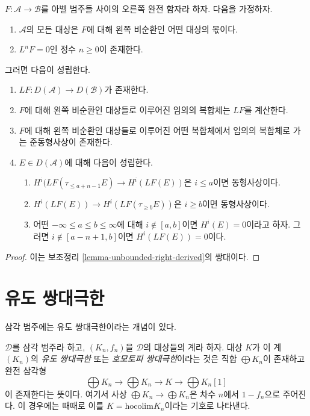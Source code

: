 \begin{lemma}
\label{lemma-unbounded-left-derived}
$F : \mathcal{A} \to \mathcal{B}$를 아벨 범주들 사이의 오른쪽 완전
함자라 하자. 다음을 가정하자.
\begin{enumerate}
\item $\mathcal{A}$의 모든 대상은 $F$에 대해 왼쪽 비순환인 어떤
대상의 몫이다.
\item $L^nF = 0$인 정수 $n \geq 0$이 존재한다.
\end{enumerate}
그러면 다음이 성립한다.
\begin{enumerate}
\item $LF : D(\mathcal{A}) \to D(\mathcal{B})$가 존재한다.
\item $F$에 대해 왼쪽 비순환인 대상들로 이루어진 임의의 복합체는
$LF$를 계산한다.
\item $F$에 대해 왼쪽 비순환인 대상들로 이루어진 어떤 복합체에서
임의의 복합체로 가는 준동형사상이 존재한다.
\item $E \in D(\mathcal{A})$에 대해 다음이 성립한다.
\begin{enumerate}
\item $H^i(LF(\tau_{\leq a + n - 1}E) \to H^i(LF(E))$은
$i \leq a$이면 동형사상이다.
\item $H^i(LF(E)) \to H^i(LF(\tau_{\geq b}E))$은 $i \geq b$이면
동형사상이다.
\item 어떤 $-\infty \leq a \leq b \leq \infty$에 대해
$i \not \in [a, b]$이면 $H^i(E) = 0$이라고 하자. 그러면
$i \not \in [a - n + 1, b]$이면 $H^i(LF(E)) = 0$이다.
\end{enumerate}
\end{enumerate}
\end{lemma}

\begin{proof}
이는 보조정리 \ref{lemma-unbounded-right-derived}의 쌍대이다.
\end{proof}

\section{유도 쌍대극한}
\label{section-derived-colimit}

\noindent
삼각 범주에는 유도 쌍대극한이라는 개념이 있다.

\begin{definition}
\label{definition-derived-colimit}
$\mathcal{D}$를 삼각 범주라 하고, $(K_n, f_n)$을 $\mathcal{D}$의
대상들의 계라 하자. 대상 $K$가 이 계 $(K_n)$의
{\it 유도 쌍대극한} 또는 {\it 호모토피 쌍대극한}이라는 것은
직합 $\bigoplus K_n$이 존재하고 완전 삼각형
$$
\bigoplus K_n \to \bigoplus K_n \to K \to \bigoplus K_n[1]
$$
이 존재한다는 뜻이다. 여기서 사상
$\bigoplus K_n \to \bigoplus K_n$은 차수 $n$에서 $1 - f_n$으로
주어진다. 이 경우에는 때때로 이를
$K = \text{hocolim} K_n$이라는 기호로 나타낸다.
\end{definition}

